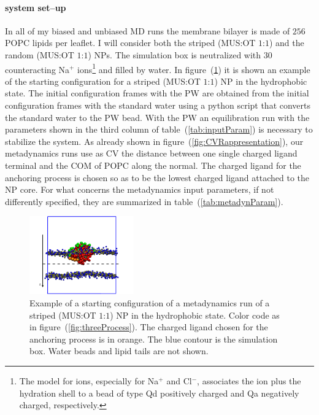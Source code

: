 \paragraph{\textbf{system set--up}} In all of my biased and unbiased \ac{MD} runs the membrane bilayer is made of $256$ \ac{POPC} lipids per leaflet. I will consider both the striped (\ac{MUS}:\ac{OT} $1$:$1$) and the random (\ac{MUS}:\ac{OT} $1$:$1$) \acp{NP}. The simulation box is neutralized with $30$ counteracting Na$^+$ ions\footnote{The \martini model for ions, especially for Na$^+$ and Cl$^-$, associates the ion plus the hydration shell to a bead of type Qd positively charged and Qa negatively charged, respectively.} and filled by water. In figure~(\ref{fig:startFrameHydro}) it is shown an example of the starting configuration for a striped (\ac{MUS}:\ac{OT} $1$:$1$) \ac{NP} in the hydrophobic state. The initial configuration frames with the \ac{PW} are obtained from the initial configuration frames with the standard \martini water using a python script that converts the standard \martini water to the \ac{PW} bead. With the \ac{PW} an equilibration run with the parameters shown in the third column of table~(\ref{tab:inputParam}) is necessary to stabilize the system. As already shown in figure~(\ref{fig:CVRappresentation}), our metadynamics runs use as \ac{CV} the distance between one single charged ligand terminal and the \ac{COM} of \ac{POPC} along the normal. The charged ligand for the anchoring process is chosen so as to be the lowest charged ligand attached to the \ac{NP} core. For what concerns the metadynamics input parameters, if not differently specified, they are summarized in table~(\ref{tab:metadynParam}).
\begin{figure}
	\centering
	\includegraphics[width=0.4\textwidth]{./img/patchedHydrophobic}
	\caption{Example of a starting configuration of a metadynamics run of a striped (\ac{MUS}:\ac{OT} $1$:$1$) \ac{NP} in the hydrophobic state. Color code as in figure~(\ref{fig:threeProcess}). The charged ligand chosen for the anchoring process is in orange. The blue contour is the simulation box. Water beads and lipid tails are not shown.}%
	\label{fig:startFrameHydro}
\end{figure}

